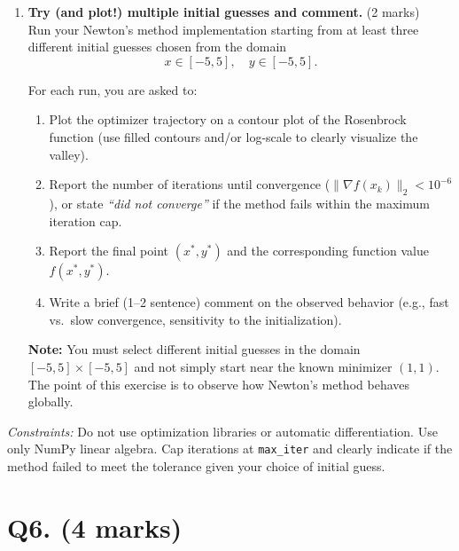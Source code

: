 \documentclass[11pt]{article}
\begin{document}
\begin{enumerate}
\begin{verbatim}
    Example
    -------
    >>> x_star, history = newton_method(f_rosenbrock, Grad, Hessian, [0,0])
    >>> history[0]
    {'k': 0, 'x': np.array([0.0, 0.0]), 'f': 1.0, 'grad_norm': 2.0}
    """
    # your code here
\end{verbatim}
\newpage
\item \textbf{Try (and plot!) multiple initial guesses and comment.} (2 marks) \\

Run your Newton's method implementation starting from at least three different 
initial guesses chosen from the domain
\[
x \in [-5,5], \quad y \in [-5,5].
\]

For each run, you are asked to:

\begin{enumerate}
    \item Plot the optimizer trajectory on a contour plot of the Rosenbrock function 
          (use filled contours and/or log-scale to clearly visualize the valley).
    \item Report the number of iterations until convergence 
          ($\|\nabla f(x_k)\|_2 < 10^{-6}$), or state \emph{``did not converge''} 
          if the method fails within the maximum iteration cap.
    \item Report the final point $(x^*, y^*)$ and the corresponding function value $f(x^*,y^*)$.
    \item Write a brief (1--2 sentence) comment on the observed behavior 
          (e.g., fast vs.\ slow convergence, sensitivity to the initialization).
\end{enumerate}

\textbf{Note:} You must select different initial guesses in the domain 
$[-5,5]\times[-5,5]$ and not simply start near the known minimizer $(1,1)$. 
The point of this exercise is to observe how Newton's method behaves globally.%

\end{enumerate}

\textit{Constraints:} Do not use optimization libraries or automatic differentiation.
Use only NumPy linear algebra. Cap iterations at \texttt{max\_iter} and clearly
indicate if the method failed to meet the tolerance given your choice of initial guess.

\section*{Q6. (4 marks)}
\end{document}
